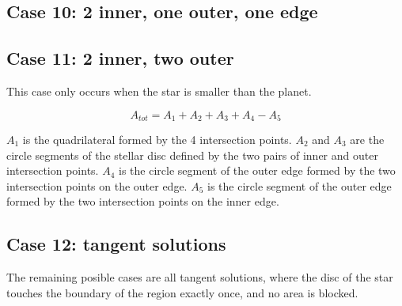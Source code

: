 \documentclass[a4paper,fleqn,usenatbib]{mnras}
\begin{document}
\subsection*{Case 10: 2 inner, one outer, one edge}



\subsection*{Case 11: 2 inner, two outer}

This case only occurs when the star is smaller than the planet.

\begin{equation} \label{eq:inner_outer}
A_{tot} = A_1 + A_2 + A_3 + A_4 - A_5
\end{equation}

$A_1$ is the quadrilateral formed by the 4 intersection points. $A_2$ and $A_3$ are the circle segments of the stellar disc defined by the two pairs of inner and outer intersection points. $A_4$ is the circle segment of the outer edge formed by the two intersection points on the outer edge. $A_5$ is the circle segment of the outer edge formed by the two intersection points on the inner edge.

\subsection*{Case 12: tangent solutions}

The remaining posible cases are all tangent solutions, where the disc of the star touches the boundary of the region exactly once, and no area is blocked.	




\bsp	%
\label{lastpage}
\end{document}
